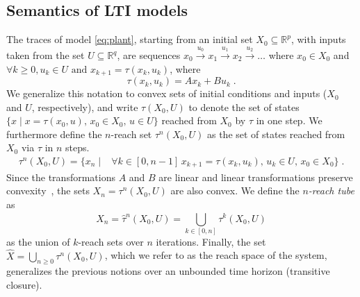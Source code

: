 \documentclass[sigconf]{llncs}
\newcommand{\mat}[1]{{#1}}
\renewcommand{\vec}[1]{{#1}}
\renewcommand{\note}[1]{\textcolor{red}{[#1]}}
\begin{document}
\subsection{Semantics of LTI models}\label{sec:model_semantics}
%
The traces of model \eqref{eq:plant}, starting from an initial set
$X_0\subseteq \mathbb{R}^p$, with inputs taken from the set $U \subseteq
\mathbb{R}^q$, are sequences
%
$ \vec{x}_0 \xrightarrow{\vec{u}_0} \vec{x}_1 \xrightarrow{\vec{u}_1} \vec{x}_2 \xrightarrow{\vec{u}_2} \ldots $
%
where
%
$ \vec{x}_0 \in X_0$ and $\forall k\geq 0, \vec{u}_k \in U \text{ and } \vec{x}_{k+1} = \tau(\vec{x}_k,\vec{u}_k) $, 
where 
%
\begin{equation}\label{equ:reachtraj}
\tau(\vec{x}_k,\vec{u}_k) = %
\mat{A}\vec{x}_k + \mat{B}\vec{u}_k \;.
\end{equation}
%
%
We generalize this notation to convex sets of initial conditions and inputs
($X_0$ and $U$, respectively), and write $\tau(X_0,U)$ to denote the set of
states $\{\vec{x} \mid \vec{x} = \tau(\vec{x}_0,\vec{u}),\, \vec{x}_0 \in
X_0,\, \vec{u} \in U \}$ reached from $X_0$ by $\tau$ in one step.
%
We furthermore define the $n$-reach set $\tau^n(X_0,U)$ as the set of states
reached from $X_0$ via $\tau$ in $n$ steps.
%
\begin{align}\label{equ:reachset}
\tau^n(X_0,U) = \{\vec{x}_n \mid & 
\forall k\in [0,n-1] \, \vec{x}_{k+1}=\tau(\vec{x}_{k},\vec{u}_{k}), \,
\vec{u}_{k} \in U, \,   
\vec{x}_0 \in X_0
\} \;. 
\end{align}
%
Since the transformations $\mat{A}$ and $\mat{B}$ are linear and linear
transformations preserve convexity~\cite{boyd2004convex}, the sets $X_n =
\tau^n(X_0,U)$ are also convex.  We define the \emph{$n$-reach tube} as
%
\begin{equation}\label{equ:reachtube}
\hat{X}_n=\hat{\tau}^n(X_0,U)=\bigcup_{k\in[0,n]} \tau^k(X_0,U)
\end{equation}
%
as the union of $k$-reach sets over $n$ iterations. 
%
Finally, the set $\hat{X} =\bigcup_{n\geq 0} \tau^n(X_0,U)$, which we refer
to as the reach space of the system, generalizes the previous notions over
an unbounded time horizon (transitive closure).
\end{document}
